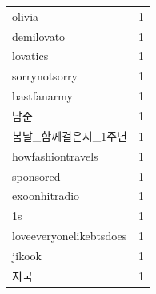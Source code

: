 \begin{tabular}{lr}
olivia & 1 \\
demilovato & 1 \\
lovatics & 1 \\
sorrynotsorry & 1 \\
bastfanarmy & 1 \\
남준 & 1 \\
봄날\_함께걸은지\_1주년 & 1 \\
howfashiontravels & 1 \\
sponsored & 1 \\
exoonhitradio & 1 \\
1s & 1 \\
loveeveryonelikebtsdoes & 1 \\
jikook & 1 \\
지국 & 1 \\
\bottomrule
\end{tabular}
